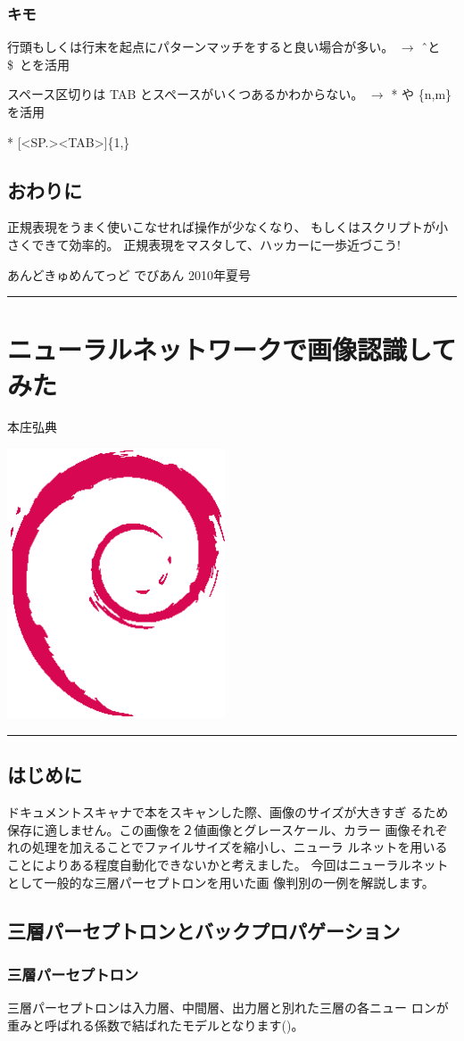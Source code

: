 \documentclass[mingoth,a4paper]{jsarticle}
\renewcommand{\dancersection}[2]{%
\newpage
あんどきゅめんてっど でびあん 2010年夏号
%
\vspace{0.1mm}\\
{\color{dancerlightblue}\rule{\hsize}{2mm}}

%
%
\begin{minipage}[t]{0.6\hsize}
\color{dancerdarkblue}
\vspace{1cm}
\section{#1}
\hfill{}#2\\
\end{minipage}
\begin{minipage}[t]{0.4\hsize}
\vspace{-2cm}
\hfill{}\includegraphics[height=8cm]{image200502/openlogo-nd.eps}\\
\vspace{-5cm}
\end{minipage}
%
%
{\color{dancerdarkblue}\rule{0.74\hsize}{2mm}}
%
\vspace{2cm}
}
\begin{document}
\subsubsection{キモ}

行頭もしくは行末を起点にパターンマッチをすると良い場合が多い。
$\rightarrow$ \^\ と \$\ とを活用

スペース区切りは TAB とスペースがいくつあるかわからない。
$\rightarrow$  * や \{n,m\} を活用
\begin{commandline}
[<SP.><TAB>][<SP><TAB>]*
[<SP.><TAB>]\{1,\}
\end{commandline}

\subsection{おわりに}

正規表現をうまく使いこなせれば操作が少なくなり、
もしくはスクリプトが小さくできて効率的。 正規表現をマスタして、ハッカーに一歩近づこう!

\dancersection{ニューラルネットワークで画像認識してみた}{本庄弘典}

\subsection{はじめに}

ドキュメントスキャナで本をスキャンした際、画像のサイズが大きすぎ
るため保存に適しません。この画像を２値画像とグレースケール、カラー
画像それぞれの処理を加えることでファイルサイズを縮小し、ニューラ
ルネットを用いることによりある程度自動化できないかと考えました。
今回はニューラルネットとして一般的な三層パーセプトロンを用いた画
像判別の一例を解説します。

\subsection{三層パーセプトロンとバックプロパゲーション}

\subsubsection{三層パーセプトロン}

三層パーセプトロンは入力層、中間層、出力層と別れた三層の各ニュー
ロンが重みと呼ばれる係数で結ばれたモデルとなります()。
\end{document}
